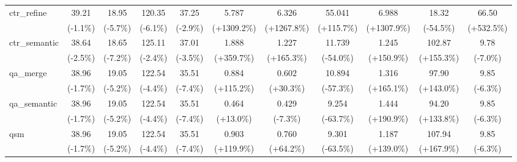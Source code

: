 \begin{table}[t]
{\begin{tabular}{l|cccccccccc}
    ctr\_refine & 39.21 & 18.95 & 120.35 & 37.25 & 5.787 & 6.326 & 55.041 & 6.988 & 18.32 & 66.50 \\
     & {\tiny\color{green!60!black}(-1.1\%)} & {\tiny\color{green!60!black}(-5.7\%)} & {\tiny\color{green!60!black}(-6.1\%)} & {\tiny\color{green!60!black}(-2.9\%)} & {\tiny\color{red!70!black}(+1309.2\%)} & {\tiny\color{red!70!black}(+1267.8\%)} & {\tiny\color{red!70!black}(+115.7\%)} & {\tiny\color{red!70!black}(+1307.9\%)} & {\tiny\color{red!70!black}(-54.5\%)} & {\tiny\color{red!70!black}(+532.5\%)} \\
    ctr\_semantic & 38.64 & 18.65 & 125.11 & 37.01 & 1.888 & 1.227 & 11.739 & 1.245 & 102.87 & 9.78 \\
     & {\tiny\color{green!60!black}(-2.5\%)} & {\tiny\color{green!60!black}(-7.2\%)} & {\tiny\color{green!60!black}(-2.4\%)} & {\tiny\color{green!60!black}(-3.5\%)} & {\tiny\color{red!70!black}(+359.7\%)} & {\tiny\color{red!70!black}(+165.3\%)} & {\tiny\color{green!60!black}(-54.0\%)} & {\tiny\color{red!70!black}(+150.9\%)} & {\tiny\color{green!60!black}(+155.3\%)} & {\tiny\color{green!60!black}(-7.0\%)} \\
    qa\_merge & 38.96 & 19.05 & 122.54 & 35.51 & 0.884 & 0.602 & 10.894 & 1.316 & 97.90 & 9.85 \\
     & {\tiny\color{green!60!black}(-1.7\%)} & {\tiny\color{green!60!black}(-5.2\%)} & {\tiny\color{green!60!black}(-4.4\%)} & {\tiny\color{green!60!black}(-7.4\%)} & {\tiny\color{red!70!black}(+115.2\%)} & {\tiny\color{red!70!black}(+30.3\%)} & {\tiny\color{green!60!black}(-57.3\%)} & {\tiny\color{red!70!black}(+165.1\%)} & {\tiny\color{green!60!black}(+143.0\%)} & {\tiny\color{green!60!black}(-6.3\%)} \\
    qa\_semantic & 38.96 & 19.05 & 122.54 & 35.51 & 0.464 & 0.429 & 9.254 & 1.444 & 94.20 & 9.85 \\
     & {\tiny\color{green!60!black}(-1.7\%)} & {\tiny\color{green!60!black}(-5.2\%)} & {\tiny\color{green!60!black}(-4.4\%)} & {\tiny\color{green!60!black}(-7.4\%)} & {\tiny\color{red!70!black}(+13.0\%)} & {\tiny\color{green!60!black}(-7.3\%)} & {\tiny\color{green!60!black}(-63.7\%)} & {\tiny\color{red!70!black}(+190.9\%)} & {\tiny\color{green!60!black}(+133.8\%)} & {\tiny\color{green!60!black}(-6.3\%)} \\
    qsm & 38.96 & 19.05 & 122.54 & 35.51 & 0.903 & 0.760 & 9.301 & 1.187 & 107.94 & 9.85 \\
     & {\tiny\color{green!60!black}(-1.7\%)} & {\tiny\color{green!60!black}(-5.2\%)} & {\tiny\color{green!60!black}(-4.4\%)} & {\tiny\color{green!60!black}(-7.4\%)} & {\tiny\color{red!70!black}(+119.9\%)} & {\tiny\color{red!70!black}(+64.2\%)} & {\tiny\color{green!60!black}(-63.5\%)} & {\tiny\color{red!70!black}(+139.0\%)} & {\tiny\color{green!60!black}(+167.9\%)} & {\tiny\color{green!60!black}(-6.3\%)} \\

\end{tabular}}
\end{table}
